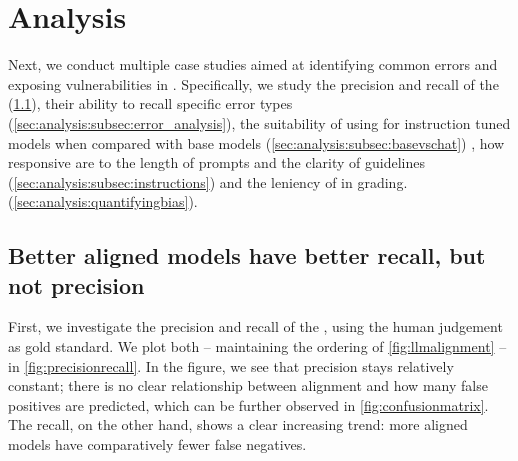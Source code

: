 \section {Analysis}\label{sec:analysis}

Next, we conduct multiple case studies aimed at identifying common errors and exposing vulnerabilities in \judgemodels.
Specifically, we study the precision and recall of the \judgemodels (\cref{sec:analysis:subsec:precision_recall}), their ability to recall specific error types (\cref{sec:analysis:subsec:error_analysis}),  the suitability of using \judgemodels for instruction tuned models when compared with base models (\cref{sec:analysis:subsec:basevschat})
, how responsive \judgemodels are to the length of prompts and the clarity of guidelines (\cref{sec:analysis:subsec:instructions}) and the leniency of \judgemodels in grading. (\cref{sec:analysis:quantifyingbias}).  

\subsection{Better aligned models have better recall, but not precision}
\label{sec:analysis:subsec:precision_recall}

First, we investigate the precision and recall of the \judgemodels, using the human judgement as gold standard.
We plot both -- maintaining the ordering of \cref{fig:llmalignment} -- in \cref{fig:precisionrecall}.
In the figure, we see that precision stays relatively constant; there is no clear relationship between alignment and how many false positives are predicted, which can be further observed in \cref{fig:confusionmatrix}.
The recall, on the other hand, shows a clear increasing trend: more aligned models have comparatively fewer false negatives.

